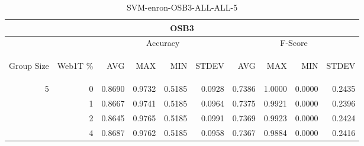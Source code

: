 \begin{center}
\begin{table}[htbp] 
 \begin{center}
\begin{tabular}{ | r | r | r | r | r | r | r | r | r | r |}
\hline
\multicolumn{10}{|c|}{OSB3}\\
\hline
 & & \multicolumn{4}{|c|}{Accuracy} & \multicolumn{4}{|c|}{F-Score}\\ \cline{3-10}
\begin{sideways}Group Size\end{sideways} & \begin{sideways}Web1T \%\end{sideways} & \begin{sideways}AVG\end{sideways} & \begin{sideways}MAX\end{sideways} & \begin{sideways}MIN\end{sideways} & \begin{sideways}STDEV\end{sideways} & \begin{sideways}AVG\end{sideways} & \begin{sideways}MAX\end{sideways} & \begin{sideways}MIN\end{sideways} & \begin{sideways}STDEV\end{sideways}\\
\hline
\multirow{3}{*}{5}
 & 0 & 0.8690 & 0.9732 & 0.5185 & 0.0928 & 0.7386 & 1.0000 & 0.0000 & 0.2435\\ \cline{2-10}
 & 1 & 0.8667 & 0.9741 & 0.5185 & 0.0964 & 0.7375 & 0.9921 & 0.0000 & 0.2396\\ \cline{2-10}
 & 2 & 0.8645 & 0.9765 & 0.5185 & 0.0991 & 0.7369 & 0.9923 & 0.0000 & 0.2424\\ \cline{2-10}
 & 4 & 0.8687 & 0.9762 & 0.5185 & 0.0958 & 0.7367 & 0.9884 & 0.0000 & 0.2416\\ \cline{2-10}
\hline
\end{tabular}
\caption{SVM-enron-OSB3-ALL-ALL-5}
\label{table:SVM-enron-OSB3-ALL-ALL-5}
\end{center}
 \end{table}
\end{center}

